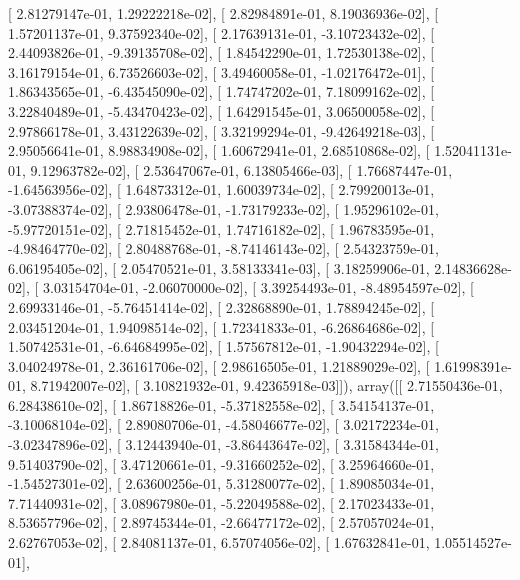 \documentclass{article}
\begin{document}
       [  2.81279147e-01,   1.29222218e-02],
       [  2.82984891e-01,   8.19036936e-02],
       [  1.57201137e-01,   9.37592340e-02],
       [  2.17639131e-01,  -3.10723432e-02],
       [  2.44093826e-01,  -9.39135708e-02],
       [  1.84542290e-01,   1.72530138e-02],
       [  3.16179154e-01,   6.73526603e-02],
       [  3.49460058e-01,  -1.02176472e-01],
       [  1.86343565e-01,  -6.43545090e-02],
       [  1.74747202e-01,   7.18099162e-02],
       [  3.22840489e-01,  -5.43470423e-02],
       [  1.64291545e-01,   3.06500058e-02],
       [  2.97866178e-01,   3.43122639e-02],
       [  3.32199294e-01,  -9.42649218e-03],
       [  2.95056641e-01,   8.98834908e-02],
       [  1.60672941e-01,   2.68510868e-02],
       [  1.52041131e-01,   9.12963782e-02],
       [  2.53647067e-01,   6.13805466e-03],
       [  1.76687447e-01,  -1.64563956e-02],
       [  1.64873312e-01,   1.60039734e-02],
       [  2.79920013e-01,  -3.07388374e-02],
       [  2.93806478e-01,  -1.73179233e-02],
       [  1.95296102e-01,  -5.97720151e-02],
       [  2.71815452e-01,   1.74716182e-02],
       [  1.96783595e-01,  -4.98464770e-02],
       [  2.80488768e-01,  -8.74146143e-02],
       [  2.54323759e-01,   6.06195405e-02],
       [  2.05470521e-01,   3.58133341e-03],
       [  3.18259906e-01,   2.14836628e-02],
       [  3.03154704e-01,  -2.06070000e-02],
       [  3.39254493e-01,  -8.48954597e-02],
       [  2.69933146e-01,  -5.76451414e-02],
       [  2.32868890e-01,   1.78894245e-02],
       [  2.03451204e-01,   1.94098514e-02],
       [  1.72341833e-01,  -6.26864686e-02],
       [  1.50742531e-01,  -6.64684995e-02],
       [  1.57567812e-01,  -1.90432294e-02],
       [  3.04024978e-01,   2.36161706e-02],
       [  2.98616505e-01,   1.21889029e-02],
       [  1.61998391e-01,   8.71942007e-02],
       [  3.10821932e-01,   9.42365918e-03]]), array([[  2.71550436e-01,   6.28438610e-02],
       [  1.86718826e-01,  -5.37182558e-02],
       [  3.54154137e-01,  -3.10068104e-02],
       [  2.89080706e-01,  -4.58046677e-02],
       [  3.02172234e-01,  -3.02347896e-02],
       [  3.12443940e-01,  -3.86443647e-02],
       [  3.31584344e-01,   9.51403790e-02],
       [  3.47120661e-01,  -9.31660252e-02],
       [  3.25964660e-01,  -1.54527301e-02],
       [  2.63600256e-01,   5.31280077e-02],
       [  1.89085034e-01,   7.71440931e-02],
       [  3.08967980e-01,  -5.22049588e-02],
       [  2.17023433e-01,   8.53657796e-02],
       [  2.89745344e-01,  -2.66477172e-02],
       [  2.57057024e-01,   2.62767053e-02],
       [  2.84081137e-01,   6.57074056e-02],
       [  1.67632841e-01,   1.05514527e-01],
\end{document}
